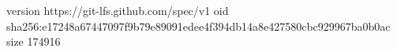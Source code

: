 version https://git-lfs.github.com/spec/v1
oid sha256:e17248a67447097f9b79e89091edee4f394db14a8e427580cbc929967ba0b0ac
size 174916
